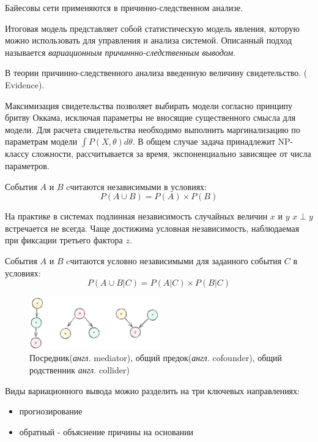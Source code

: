 


Байесовы сети применяются в причинно-следственном анализе.

Итоговая модель представляет собой статистическую модель явления, которую можно использовать для
управления и анализа системой. 
Описанный подход называется \textit{вариационным причиннно-следственным выводом}.

В теории причинно-следственного анализа введенную величину
свидетельство. ( Evidence).

Максимизация свидетельства
позволяет выбирать модели согласно принципу бритву Оккама, исключая
параметры не вносящие существенного смысла для модели. Для расчета свидетельства необходимо выполнить маргинализацию по параметрам
модели $\int P(X, \theta) d\theta$. В общем случае задача принадлежит 
NP-классу сложности, рассчитывается за время, экспоненциально зависящее
от числа параметров. 

 События $A$ и $B$ cчитаются независимыми в условиях:
\begin{equation}
    P(A \cup B) = P(A) \times P(B)
\end{equation}

На практике в системах подлинная независимость случайных величин $x$ и $y$
$x \perp y$ встречается не всегда. Чаще достижима условная независимость, наблюдаемая при
фиксации третьего фактора $z$.

 События $A$ и $B$ cчитаются условно независимыми 
для заданного события $C$ в условиях:
\begin{equation}
    P(A \cup B |C) = P(A|C) \times P(B|C)
\end{equation}

\begin{figure}[h]
    \centering
    \includegraphics[width=0.5\textwidth]{assets/math/discrete/bayes_net.excalidraw.png}
    \caption{Посредник(\textit{англ.} mediator), общий предок(\textit{англ.} cofounder), 
 общий родственник \textit{англ.} collider) }
    \label{discr_vs_gen}
\end{figure}

Виды вариационного вывода можно разделить на три ключевых направлениях: \begin{itemize}
    \item прогнозирование
    \item обратный - объяснение причины на основании
\end{itemize}

